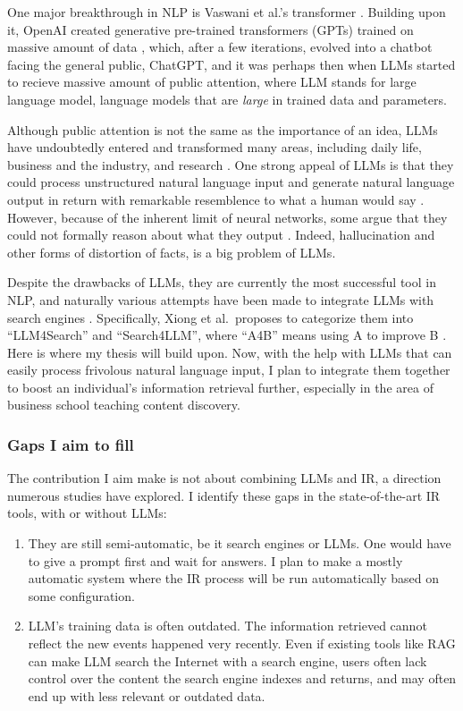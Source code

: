 \documentclass[final-report]{report-template}
\begin{document}
One major breakthrough in NLP is Vaswani et al.'s transformer \cite{transformer}. 
Building upon it, OpenAI created generative pre-trained transformers (GPTs)
trained on massive amount of data \cite{gpt1}, which, after a few iterations,
evolved into a chatbot facing the general public, ChatGPT, and it was perhaps
then when LLMs started to recieve massive amount of public attention, where LLM
stands for large language model, language models that are \emph{large} in trained
data and parameters.

Although public attention is not the same as the importance of an idea, LLMs
have undoubtedly entered and transformed many areas, including daily life,
business and the industry, and research \cite{llm.impact.1}. One strong appeal
of LLMs is that they could process unstructured natural language input and generate
natural language output in return with remarkable resemblence to what a human
would say \cite{llm.power.1, llm.power.2}. However, because of the inherent
limit of neural networks, some argue that they could not formally reason about
what they output \cite{llm.limit.1, llm.limit.2, llm.limit.3}. Indeed,
hallucination \cite{llm.hallucination.1, llm.hallucination.2} and other forms
of distortion of facts, is a big problem of LLMs.

Despite the drawbacks of LLMs, they are currently the most successful tool in
NLP, and naturally various attempts have been made to integrate LLMs with search
engines \cite{llm.meet.search.1, llm.meet.search.2, llm.meet.search.3}.
Specifically, Xiong et al.\ proposes to categorize them into ``LLM4Search'' and
``Search4LLM'', where ``A4B'' means using A to improve B
\cite{llm.meet.search.1}. Here is where my thesis will build upon.  Now, with
the help with LLMs that can easily process frivolous natural language input, I
plan to integrate them together to boost an individual's information retrieval
further, especially in the area of business school teaching content discovery.

\subsubsection{Gaps I aim to fill}
The contribution I aim make is not about combining LLMs and IR, a direction
numerous studies have explored. I identify these gaps in the state-of-the-art IR
tools, with or without LLMs:
\begin{enumerate}
	\item They are still semi-automatic, be it search engines or LLMs. One
	would have to give a prompt first and wait for answers. I plan to make a mostly
	automatic system where the IR process will be run automatically based on
	some configuration.
	\item LLM's training data is often outdated. The information retrieved
		cannot reflect the new events happened very recently. Even if existing
		tools like RAG can make LLM search the Internet with a search engine,
		users often lack control over the content the search engine indexes and
		returns, and may often end up with less relevant or outdated data.
\end{enumerate}
\end{document}
